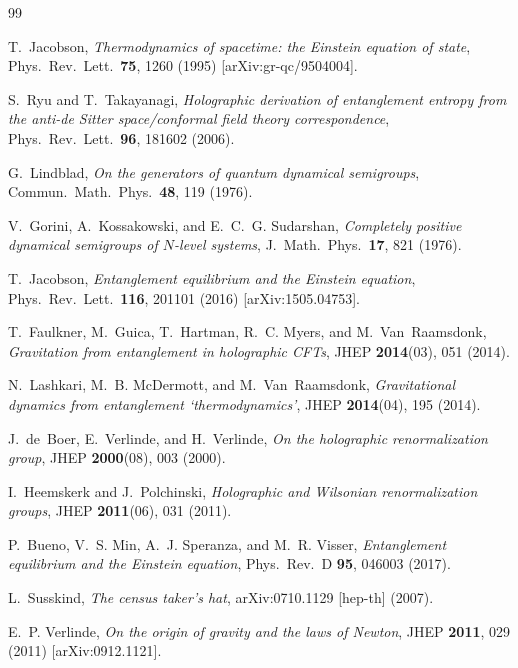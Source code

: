 \documentclass[12pt]{article}
\begin{document}
\begin{thebibliography}{99}

T.~Jacobson,
\textit{Thermodynamics of spacetime: the Einstein equation of state},
Phys.\ Rev.\ Lett.\ \textbf{75}, 1260 (1995)
[arXiv:gr-qc/9504004].

S.~Ryu and T.~Takayanagi,
\textit{Holographic derivation of entanglement entropy from the anti-de Sitter
space/conformal field theory correspondence},
Phys.\ Rev.\ Lett.\ \textbf{96}, 181602 (2006).

G.~Lindblad,
\textit{On the generators of quantum dynamical semigroups},
Commun.\ Math.\ Phys.\ \textbf{48}, 119 (1976).

V.~Gorini, A.~Kossakowski, and E.~C.~G. Sudarshan,
\textit{Completely positive dynamical semigroups of $N$-level systems},
J.\ Math.\ Phys.\ \textbf{17}, 821 (1976).

T.~Jacobson,
\textit{Entanglement equilibrium and the Einstein equation},
Phys.\ Rev.\ Lett.\ \textbf{116}, 201101 (2016)
[arXiv:1505.04753].

T.~Faulkner, M.~Guica, T.~Hartman, R.~C. Myers, and M.~Van~Raamsdonk,
\textit{Gravitation from entanglement in holographic CFTs},
JHEP \textbf{2014}(03), 051 (2014).

N.~Lashkari, M.~B. McDermott, and M.~Van~Raamsdonk,
\textit{Gravitational dynamics from entanglement `thermodynamics'},
JHEP \textbf{2014}(04), 195 (2014).

J.~de~Boer, E.~Verlinde, and H.~Verlinde,
\textit{On the holographic renormalization group},
JHEP \textbf{2000}(08), 003 (2000).

I.~Heemskerk and J.~Polchinski,
\textit{Holographic and Wilsonian renormalization groups},
JHEP \textbf{2011}(06), 031 (2011).

P.~Bueno, V.~S. Min, A.~J. Speranza, and M.~R. Visser,
\textit{Entanglement equilibrium and the Einstein equation},
Phys.\ Rev.\ D \textbf{95}, 046003 (2017).

L.~Susskind,
\textit{The census taker's hat},
arXiv:0710.1129 [hep-th] (2007).

E.~P. Verlinde,
\textit{On the origin of gravity and the laws of Newton},
JHEP \textbf{2011}, 029 (2011)
[arXiv:0912.1121].


\end{thebibliography}
\end{document}
